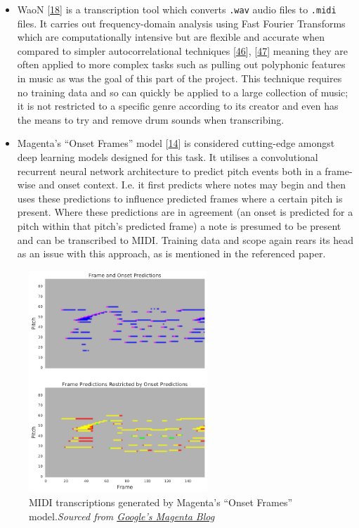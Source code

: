 \documentclass[12pt,]{article}
\providecommand{\tightlist}{%
  \setlength{\itemsep}{0pt}\setlength{\parskip}{0pt}}
\begin{document}
\begin{itemize}
\tightlist
\item
  WaoN {[}\protect\hyperlink{ref-waon}{18}{]} is a transcription tool
  which converts \texttt{.wav} audio files to \texttt{.midi} files. It
  carries out frequency-domain analysis using Fast Fourier Transforms
  which are computationally intensive but are flexible and accurate when
  compared to simpler autocorrelational techniques
  {[}\protect\hyperlink{ref-klapuri2004automatic}{46}{]},
  {[}\protect\hyperlink{ref-gerhard2003pitch}{47}{]} meaning they are
  often applied to more complex tasks such as pulling out polyphonic
  features in music as was the goal of this part of the project. This
  technique requires no training data and so can quickly be applied to a
  large collection of music; it is not restricted to a specific genre
  according to its creator and even has the means to try and remove drum
  sounds when transcribing.
\item
  Magenta's ``Onset Frames'' model
  {[}\protect\hyperlink{ref-hawthorne2017onsets}{14}{]} is considered
  cutting-edge amongst deep learning models designed for this task. It
  utilises a convolutional recurrent neural network architecture to
  predict pitch events both in a frame-wise and onset context. I.e. it
  first predicts where notes may begin and then uses these predictions
  to influence predicted frames where a certain pitch is present. Where
  these predictions are in agreement (an onset is predicted for a pitch
  within that pitch's predicted frame) a note is presumed to be present
  and can be transcribed to MIDI. Training data and scope again rears
  its head as an issue with this approach, as is mentioned in the
  referenced paper.
\end{itemize}

\begin{figure}
\centering
\includegraphics[width=0.6\textwidth,height=\textheight]{Images/frames.png}
\caption{MIDI transcriptions generated by Magenta's ``Onset Frames''
model.\newline\textit{Sourced from \href{https://magenta.tensorflow.org/onsets-frames}{Google's Magenta Blog}}}
\end{figure}
\end{document}
